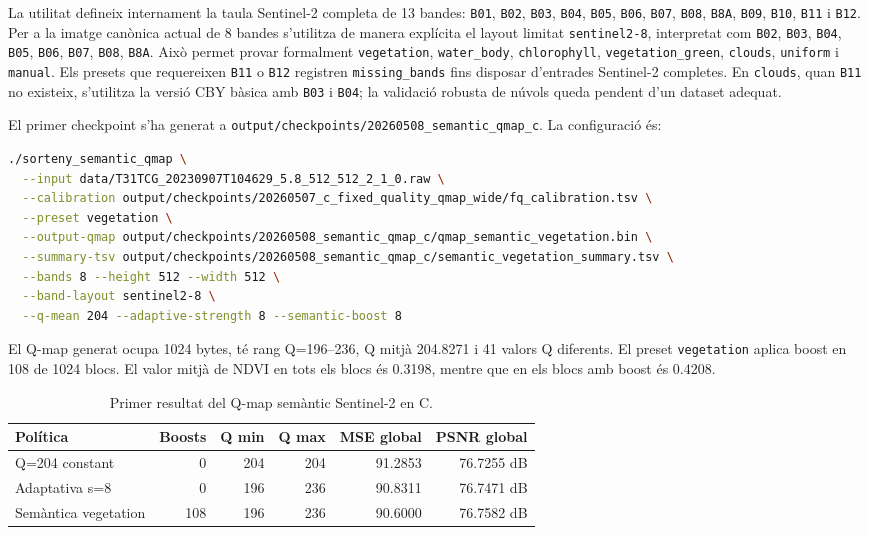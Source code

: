 \documentclass[11pt,a4paper]{article}
\begin{document}
La utilitat defineix internament la taula Sentinel-2 completa de 13 bandes: \texttt{B01}, \texttt{B02}, \texttt{B03}, \texttt{B04}, \texttt{B05}, \texttt{B06}, \texttt{B07}, \texttt{B08}, \texttt{B8A}, \texttt{B09}, \texttt{B10}, \texttt{B11} i \texttt{B12}. Per a la imatge canònica actual de 8 bandes s'utilitza de manera explícita el layout limitat \texttt{sentinel2-8}, interpretat com \texttt{B02}, \texttt{B03}, \texttt{B04}, \texttt{B05}, \texttt{B06}, \texttt{B07}, \texttt{B08}, \texttt{B8A}. Això permet provar formalment \texttt{vegetation}, \texttt{water\_body}, \texttt{chlorophyll}, \texttt{vegetation\_green}, \texttt{clouds}, \texttt{uniform} i \texttt{manual}. Els presets que requereixen \texttt{B11} o \texttt{B12} registren \texttt{missing\_bands} fins disposar d'entrades Sentinel-2 completes. En \texttt{clouds}, quan \texttt{B11} no existeix, s'utilitza la versió CBY bàsica amb \texttt{B03} i \texttt{B04}; la validació robusta de núvols queda pendent d'un dataset adequat.

El primer checkpoint s'ha generat a \texttt{output/checkpoints/20260508\_semantic\_qmap\_c}. La configuració és:

\begin{lstlisting}[language=bash]
./sorteny_semantic_qmap \
  --input data/T31TCG_20230907T104629_5.8_512_512_2_1_0.raw \
  --calibration output/checkpoints/20260507_c_fixed_quality_qmap_wide/fq_calibration.tsv \
  --preset vegetation \
  --output-qmap output/checkpoints/20260508_semantic_qmap_c/qmap_semantic_vegetation.bin \
  --summary-tsv output/checkpoints/20260508_semantic_qmap_c/semantic_vegetation_summary.tsv \
  --bands 8 --height 512 --width 512 \
  --band-layout sentinel2-8 \
  --q-mean 204 --adaptive-strength 8 --semantic-boost 8
\end{lstlisting}

El Q-map generat ocupa 1024 bytes, té rang Q=196--236, Q mitjà 204.8271 i 41 valors Q diferents. El preset \texttt{vegetation} aplica boost en 108 de 1024 blocs. El valor mitjà de NDVI en tots els blocs és 0.3198, mentre que en els blocs amb boost és 0.4208.

\begin{table}[H]
\centering
\begin{tabular}{lrrrrr}
\toprule
\textbf{Política} & \textbf{Boosts} & \textbf{Q min} & \textbf{Q max} & \textbf{MSE global} & \textbf{PSNR global} \\
\midrule
Q=204 constant & 0 & 204 & 204 & 91.2853 & 76.7255 dB \\
Adaptativa s=8 & 0 & 196 & 236 & 90.8311 & 76.7471 dB \\
Semàntica vegetation & 108 & 196 & 236 & 90.6000 & 76.7582 dB \\
\bottomrule
\end{tabular}
\caption{Primer resultat del Q-map semàntic Sentinel-2 en C.}
\end{table}
\end{document}
